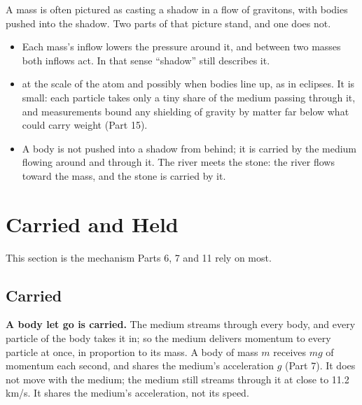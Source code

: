 \documentclass[11pt,a4paper]{article}
\begin{document}
A mass is often pictured as casting a shadow in a flow of gravitons, with bodies pushed into the shadow. Two parts of that picture stand, and one does not.
\begin{itemize}
\item {} Each mass's inflow lowers the pressure around it, and between two masses both inflows act. In that sense ``shadow'' still describes it.
\item {} at the scale of the atom and possibly when bodies line up, as in eclipses. It is small: each particle takes only a tiny share of the medium passing through it, and measurements bound any shielding of gravity by matter far below what could carry weight (Part 15).
\item {} A body is not pushed into a shadow from behind; it is carried by the medium flowing around and through it. The river meets the stone: the river flows toward the mass, and the stone is carried by it.
\end{itemize}

\section{Carried and Held}

This section is the mechanism Parts 6, 7 and 11 rely on most.

\subsection{Carried}

\begin{hypbar}
\textbf{A body let go is carried.} The medium streams through every body, and every particle of the body takes it in; so the medium delivers momentum to every particle at once, in proportion to its mass. A body of mass $m$ receives $mg$ of momentum each second, and shares the medium's acceleration $g$ (Part 7). It does not move with the medium; the medium still streams through it at close to 11.2 km/s. It shares the medium's acceleration, not its speed.
\end{hypbar}
\end{document}
